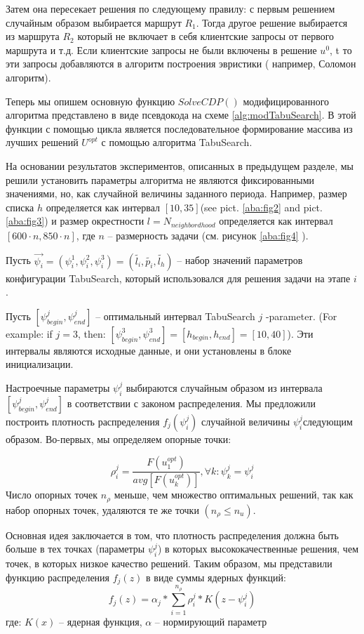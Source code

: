 \documentclass[]{TAACpaper}
\begin{document}
Затем она пересекает решения по следующему правилу: с первым решением случайным образом выбирается маршрут $R_1$. Тогда другое решение выбирается из маршрута $R_2$ который не включает в себя клиентские запросы от первого маршрута и т.д. Если клиентские запросы не были включены в решение  $u^0$, t то эти запросы добавляются в алгоритм построения эвристики ( например, Соломон алгоритм).


Теперь мы опишем основную функцию $SolveCDP()$  модифицированного алгоритма представлено в виде псевдокода на схеме \ref{alg:modTabuSearch}. В этой функции с помощью цикла является последовательное формирование массива из лучших решений $U^{opt}$ с помощью алгоритма TabuSearch.  

На основании результатов экспериментов, описанных в предыдущем разделе, мы решили установить параметры алгоритма не являются фиксированными значениями, но, как случайной величины заданного периода. Например, размер списка $h$  определяется как интервал  $[10,35]$(see pict. \ref{aba:fig2} and  pict. \ref{aba:fig3}) и размер окрестности $l=N_{neighbordhood}$ определяется как интервал $[600\cdot n,850\cdot n]$, где $n$ -- размерность задачи (см. рисунок \ref{aba:fig4} ).

Пусть $\vec{\psi_i} = (\psi^1_i,\psi^2_i,\psi^3_i) = (\tilde{l_i},\tilde{p_i},\tilde{l_h})$ -- набор значений параметров конфигурации TabuSearch, который использовался для решения задачи на этапе $i$.

Пусть $[\psi^j_{begin}, \psi^j_{end}]$ -- оптимальный интервал TabuSearch $j$ -parameter. (For example: if $j=3$, then: $[\psi^3_{begin}, \psi^3_{end}]= [h_{begin}, h_{end}] = [10, 40] $).
Эти интервалы являются исходные данные, и они установлены в блоке инициализации.

Настроечные параметры  $\psi^j_i $ выбираются случайным образом из интервала $[\psi^j_{begin}, \psi^j_{end}]$ в соответствии с законом распределения. Мы предложили построить плотность распределения $f_j(\psi^j_i)$ случайной величины $\psi^j_i$следующим образом. Во-первых, мы определяем опорные точки:
 
 \begin{equation} \label{anchor_points}
     \rho^j_i =  \dfrac{F(u^{opt}_1)}{avg[F(u^{opt}_k)]}, \forall k: \psi^j_k = \psi^j_i
 \end{equation}
Число опорных точек $n_{\rho}$  меньше, чем множество оптимальных решений, так как набор опорных точек, удаляются те же точки $(n_{\rho} \leq  n_u)$.
 
Основная идея заключается в том, что плотность распределения должна быть больше в тех точках (параметры  $\psi^j_i$) в которых высококачественные решения, чем точек, в которых низкое качество решений.
Таким образом, мы представили функцию распределения $f_j(z)$ в виде суммы ядерных функций:
 \begin{equation} \label{dist_density}
 f_j(z) = \alpha_j * \sum\limits_{i=1}^{n_{\rho}}  \rho^j_i * K(z -  \psi^j_i)
 \end{equation}
 где: $K(x)$ -- ядерная функция, $ \alpha$ -- нормирующий параметр
 
\end{document}
